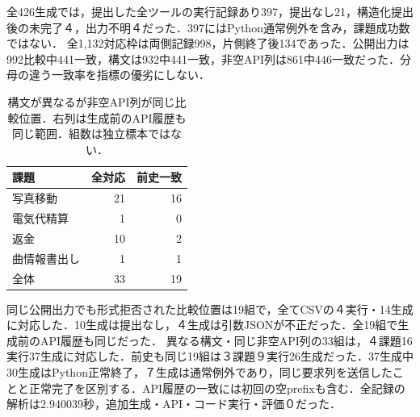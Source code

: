 全426生成では，提出した全ツールの実行記録あり397，提出なし21，構造化提出後の未完了４，出力不明４だった．397にはPython通常例外を含み，課題成功数ではない．
全1,132対応枠は両側記録998，片側終了後134であった．公開出力は992比較中441一致，構文は932中441一致，非空API列は861中446一致だった．分母の違う一致率を指標の優劣にしない．
\begin{table}[tb]
\centering\fontsize{8pt}{10pt}\selectfont\setlength{\tabcolsep}{3pt}
\caption{構文が異なるが非空API列が同じ比較位置．右列は生成前のAPI履歴も同じ範囲．組数は独立標本ではない．}
\begin{tabular}{lrr}
課題 & 全対応 & 前史一致 \\ \hline
写真移動 & 21 & 16 \\
電気代精算 & 1 & 0 \\
返金 & 10 & 2 \\
曲情報書出し & 1 & 1 \\
全体 & 33 & 19 \\
\hline\end{tabular}
\end{table}
同じ公開出力でも形式拒否された比較位置は19組で，全てCSVの４実行・14生成に対応した．10生成は提出なし，４生成は引数JSONが不正だった．全19組で生成前のAPI履歴も同じだった．
異なる構文・同じ非空API列の33組は，４課題16実行37生成に対応した．前史も同じ19組は３課題９実行26生成だった．37生成中30生成はPython正常終了，７生成は通常例外であり，同じ要求列を送信したことと正常完了を区別する．API履歴の一致には初回の空prefixも含む．全記録の解析は2.940039秒，追加生成・API・コード実行・評価０だった．
